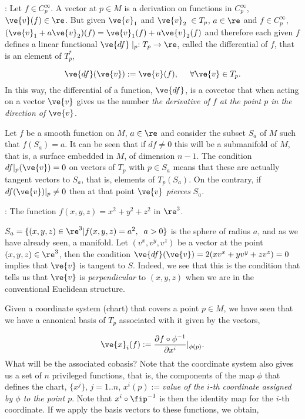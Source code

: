 \ejem: Let $f\in C^{\infty}_p$. A vector at
$p\in M$ is a derivation on functions in $C_p^{\infty}$,
$\ve{v}(f)\in \re$. 
But given $\ve{v}_1$ and $\ve{v}_2 \;\in T_p$, $a \in \re$ and $f\in C_p^{\infty}$,
$(\ve{v}_1+a\ve{v}_2)(f)= \ve{v}_1(f)+ a\ve{v}_2(f)$ and therefore each given $f$
defines a linear functional 
$\ve{df}\mid_p:T_p\to \re$, called the differential of $f$, that is
an element of $T_p^*$,

\[
\ve{df}(\ve{v}) := \ve{v}(f), \;\;\;\;\; \forall \ve{v} \in T_{p}.
\]
%
In this way, the differential of a
function, $\ve{df}$, is a covector that when acting on a vector $\ve{v}$ gives us
the number {\it the derivative of $f$ at the point $p$ in the direction of $\ve{v}$}.



Let $f$ be a smooth function on $M$, $a\in\re$ and consider the subset 
$S_{a}$ of $M$ such that $f(S_{a})=a$.
It can be seen that if $df\neq0$ this will be a submanifold of $M$, 
that is, a surface embedded in $M$, of dimension $n-1$.
The condition $df|_p(\ve{ v})=0$ on vectors of $T_p$ with $p\in S_{a}$
means that these are actually tangent vectors to $S_{a}$, that is,
elements of $T_p(S_{a})$. On the contrary, if $df(\ve{v})|_p \neq
0$ then at that point $\ve{v}$ {\it pierces} $S_{a}$. 

\ejem: The function $f(x,y,z)=x^2+y^2+z^2$ in $\re^3$. \par
$S_{a}=\{(x,y,z)\in \re^3 | f(x,y,z) = a^2,\;\; a>0\}$ is the sphere of radius
$a$, and as we have already seen, a manifold. Let $(v^{x},v^{y},v^{z})$ be a vector at the point
$(x,y,z)\in\re^{3}$, then the condition $\ve{df}(\ve{v})=2(xv^{x}+yv^{y}+zv^{z})=0$
implies that $\ve{v}$ is tangent to $S$. Indeed, we see that this is the condition that tells us that 
$\ve{v}$ is \textsl{perpendicular} to $(x,y,z)$ when we are in the conventional Euclidean structure.

\espa

Given a coordinate system (chart) that covers a point $p \in M$, we have seen that we have a canonical basis of $T_{p}$ associated with it given by the vectors,

\[
\ve{x}_{i} (f) := \frac{\partial f\circ \phi^{-1}}{\partial x^{i}}|_{\phi(p)}.
\]
%
What will be the associated cobasis? 
Note that the coordinate system also gives us a set of $n$ privileged functions, that is, the components of the map $\phi$ that defines the chart, 
$\{x^{j}\}$, $j=1..n$, 
$x^{i}(p):=$\textsl{value of the $i$-th coordinate assigned by $\phi$ to the point $p$}. 
Note that $x^{i}\circ\fip^{-1}$ is then the identity map for the $i$-th coordinate.
If we apply the basis vectors to these functions, we obtain,

